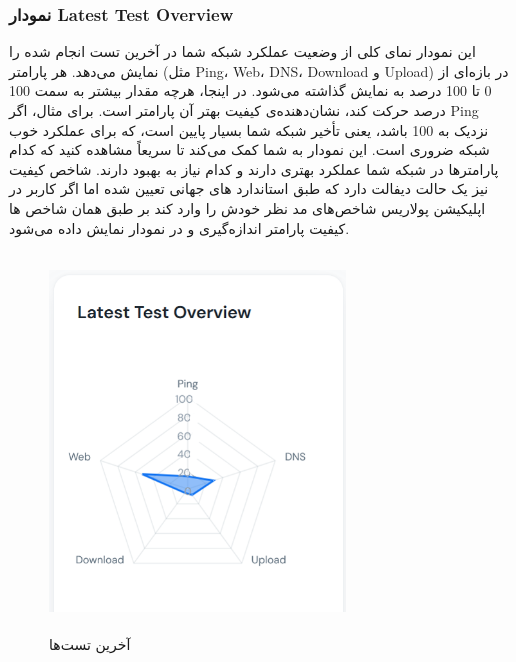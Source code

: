 \documentclass{report}
\begin{document}
\subsubsection{نمودار Latest Test Overview}
این نمودار نمای کلی از وضعیت عملکرد شبکه شما در آخرین تست انجام شده را نمایش می‌دهد. هر پارامتر (مثل Ping، Web، DNS، Download و Upload) در بازه‌ای از 0 تا 100 درصد به نمایش گذاشته می‌شود. در اینجا، هرچه مقدار بیشتر به سمت 100 درصد حرکت کند، نشان‌دهنده‌ی کیفیت بهتر آن پارامتر است. برای مثال، اگر Ping نزدیک به 100 باشد، یعنی تأخیر شبکه شما بسیار پایین است، که برای عملکرد خوب شبکه ضروری است. این نمودار به شما کمک می‌کند تا سریعاً مشاهده کنید که کدام پارامترها در شبکه شما عملکرد بهتری دارند و کدام نیاز به بهبود دارند. شاخص کیفیت نیز یک حالت دیفالت دارد که طبق استاندارد های جهانی تعیین شده اما اگر کاربر در اپلیکیشن پولاریس شاخص‌های مد نظر خودش را وارد کند بر طبق همان شاخص ها کیفیت پارامتر اندازه‌گیری و در نمودار نمایش داده می‌شود.
 \begin{figure}[h]
	\centering
	\includegraphics[width=0.7\textwidth,height=10cm,keepaspectratio]{Pic/latest}
	\caption{آخرین تست‌ها}
	\label{fig:latest}
\end{figure}
\end{document}
